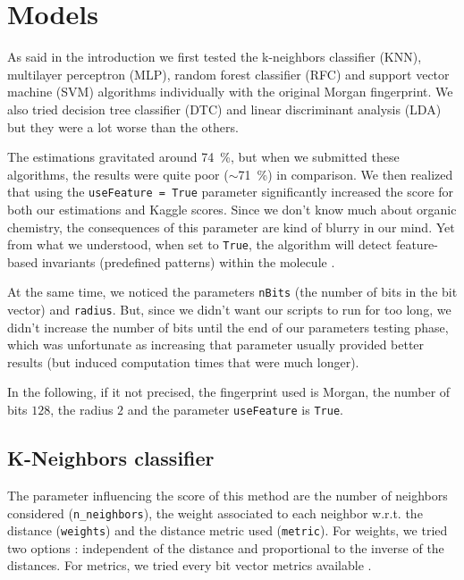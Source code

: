 \section{Models}
As said in the introduction we first tested the k-neighbors classifier (KNN), multilayer perceptron (MLP), random forest classifier (RFC) and support vector machine (SVM) algorithms individually with the original Morgan fingerprint. We also tried decision tree classifier (DTC) and linear discriminant analysis (LDA) but they were a lot worse than the others.

The estimations gravitated around \SI{74}{\percent}, but when we submitted these algorithms, the results were quite poor ($\sim$\SI{71}{\percent}) in comparison. We then realized that using the \texttt{useFeature = True} parameter significantly increased the score for both our estimations and Kaggle scores. Since we don't know much about organic chemistry, the consequences of this parameter are kind of blurry in our mind. Yet from what we understood, when set to \texttt{True}, the algorithm will detect feature-based invariants (predefined patterns) within the molecule \cite{scikit-morgan-features}.

At the same time, we noticed the parameters \texttt{nBits} (the number of bits in the bit vector) and \texttt{radius}. But, since we didn't want our scripts to run for too long, we didn't increase the number of bits until the end of our parameters testing phase, which was unfortunate as increasing that parameter usually provided better results (but induced computation times that were much longer).

In the following, if it not precised, the fingerprint used is Morgan, the number of bits $128$, the radius $2$ and the parameter \texttt{useFeature} is \texttt{True}.

\subsection{K-Neighbors classifier}

The parameter influencing the score of this method are the number of neighbors considered (\texttt{n\_neighbors}), the weight associated to each neighbor w.r.t. the distance (\texttt{weights}) and the distance metric used (\texttt{metric}). For weights, we tried two options : independent of the distance and proportional to the inverse of the distances. For metrics, we tried every bit vector metrics available \cite{scikit-distance-metrics}.


